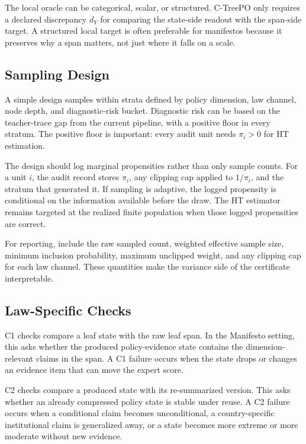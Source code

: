 The local oracle can be categorical, scalar, or structured. C-TreePO only
requires a declared discrepancy \(d_Y\) for comparing the state-side readout
with the span-side target. A structured local target is often preferable for
manifestos because it preserves why a span matters, not just where it falls on
a scale.

\subsection{Sampling Design}

A simple design samples within strata defined by policy dimension, law channel,
node depth, and diagnostic-risk bucket. Diagnostic risk can be based on the
teacher-trace gap from the current pipeline, with a positive floor in every
stratum. The positive floor is important: every audit unit needs
\(\pi_i>0\) for HT estimation.

The design should log marginal propensities rather than only sample counts.
For a unit \(i\), the audit record stores \(\pi_i\), any clipping cap applied
to \(1/\pi_i\), and the stratum that generated it. If sampling is adaptive, the
logged propensity is conditional on the information available before the draw.
The HT estimator remains targeted at the realized finite population when those
logged propensities are correct.

For reporting, include the raw sampled count, weighted effective sample size,
minimum inclusion probability, maximum unclipped weight, and any clipping cap
for each law channel. These quantities make the variance side of the
certificate interpretable.

\subsection{Law-Specific Checks}

C1 checks compare a leaf state with the raw leaf span. In the Manifesto
setting, this asks whether the produced policy-evidence state contains the
dimension-relevant claims in the span. A C1 failure occurs when the state drops
or changes an evidence item that can move the expert score.

C2 checks compare a produced state with its re-summarized version. This asks
whether an already compressed policy state is stable under reuse. A C2 failure
occurs when a conditional claim becomes unconditional, a country-specific
institutional claim is generalized away, or a state becomes more extreme or
more moderate without new evidence.

